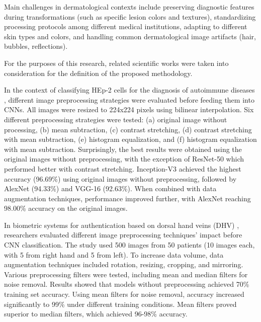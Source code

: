 \documentclass[journal]{IEEEtran}
\begin{document}
Main challenges in dermatological contexts include preserving diagnostic features during transformations (such as specific lesion colors and textures), standardizing processing protocols among different medical institutions, adapting to different skin types and colors, and handling common dermatological image artifacts (hair, bubbles, reflections).

For the purposes of this research, related scientific works were taken into consideration for the definition of the proposed methodology.

In the context of classifying HEp-2 cells for the diagnosis of autoimmune diseases \cite{RODRIGUES2020103542}, different image preprocessing strategies were evaluated before feeding them into CNNs. All images were resized to 224x224 pixels using bilinear interpolation. Six different preprocessing strategies were tested: (a) original image without processing, (b) mean subtraction, (c) contrast stretching, (d) contrast stretching with mean subtraction, (e) histogram equalization, and (f) histogram equalization with mean subtraction. Surprisingly, the best results were obtained using the original images without preprocessing, with the exception of ResNet-50 which performed better with contrast stretching. Inception-V3 achieved the highest accuracy (96.69\%) using original images without preprocessing, followed by AlexNet (94.33\%) and VGG-16 (92.63\%). When combined with data augmentation techniques, performance improved further, with AlexNet reaching 98.00\% accuracy on the original images.

In biometric systems for authentication based on dorsal hand veins (DHV) \cite{Tarawneh2024}, researchers evaluated different image preprocessing techniques' impact before CNN classification. The study used 500 images from 50 patients (10 images each, with 5 from right hand and 5 from left). To increase data volume, data augmentation techniques included rotation, resizing, cropping, and mirroring. Various preprocessing filters were tested, including mean and median filters for noise removal. Results showed that models without preprocessing achieved 70\% training set accuracy. Using mean filters for noise removal, accuracy increased significantly to 99\% under different training conditions. Mean filters proved superior to median filters, which achieved 96-98\% accuracy.
\end{document}
